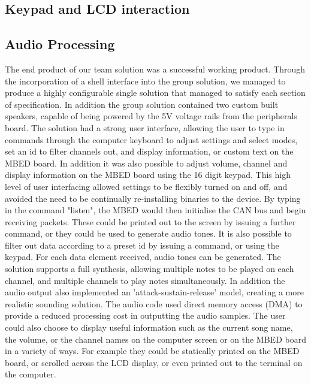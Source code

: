 \subsection*{Keypad and LCD interaction}

\subsection*{Audio Processing}





The end product of our team solution was a successful working product. Through the 
incorporation of a shell interface into the group solution, we managed to produce 
a highly configurable single solution that managed to satisfy each section of 
specification. In addition the group solution contained two custom built speakers, 
capable of being powered by the 5V voltage rails from the peripherals board. 
The solution had a strong user interface, allowing the user to type in commands 
through the computer keyboard to adjust settings and select modes, set an id 
to filter channels out, and display information, or custom text on the MBED 
board. In addition it was also possible to adjust volume, channel and display 
information on the MBED board using the 16 digit keypad. This high level of 
user interfacing allowed settings to be flexibly turned on and off, and 
avoided the need to be continually re-installing binaries to the device. 
By typing in the command "listen", the MBED would then initialise the CAN bus 
and begin receiving packets. These could be printed out to the screen by issuing
a further command, or they could be used to generate audio tones. It is also 
possible to filter out data according to a preset id by issuing a command, or 
using the keypad. For each data element received, audio tones can be generated. 
The solution supports a full synthesis, allowing multiple notes to be played
on each channel, and multiple channels to play notes simultaneously. In addition 
the audio output also implemented an 'attack-sustain-release' model, creating a 
more realistic sounding solution. The audio code used direct memory access (DMA)
to provide a reduced processing cost in outputting the audio samples.
The user could also choose to display useful information such as the current 
song name, the volume, or the channel names on the computer screen or on the 
MBED board in a variety of ways. For example they could be statically printed on
the MBED board, or scrolled across the LCD display, or even printed out to 
the terminal on the computer.

